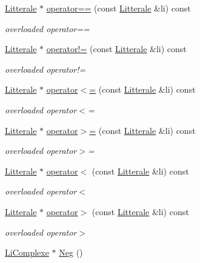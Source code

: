 \begin{DoxyCompactItemize}
\hyperlink{class_litterale}{Litterale} $\ast$ \hyperlink{class_li_complexe_a80fb4bf75402d5d1b8f1a3b9622b9047}{operator==} (const \hyperlink{class_litterale}{Litterale} \&li) const 
\begin{DoxyCompactList}\small\item\em overloaded operator== \end{DoxyCompactList}\item 
\hyperlink{class_litterale}{Litterale} $\ast$ \hyperlink{class_li_complexe_a85020ff32c533327425c70ebbf804abf}{operator!=} (const \hyperlink{class_litterale}{Litterale} \&li) const 
\begin{DoxyCompactList}\small\item\em overloaded operator!= \end{DoxyCompactList}\item 
\hyperlink{class_litterale}{Litterale} $\ast$ \hyperlink{class_li_complexe_ae749d5d340b4bf8e878442a38caa78c1}{operator$<$=} (const \hyperlink{class_litterale}{Litterale} \&li) const 
\begin{DoxyCompactList}\small\item\em overloaded operator$<$= \end{DoxyCompactList}\item 
\hyperlink{class_litterale}{Litterale} $\ast$ \hyperlink{class_li_complexe_a5c67194eb76e8760ce6dfec0e89f477a}{operator$>$=} (const \hyperlink{class_litterale}{Litterale} \&li) const 
\begin{DoxyCompactList}\small\item\em overloaded operator$>$= \end{DoxyCompactList}\item 
\hyperlink{class_litterale}{Litterale} $\ast$ \hyperlink{class_li_complexe_acb3d4e0f6636270f861490c465d07711}{operator$<$} (const \hyperlink{class_litterale}{Litterale} \&li) const 
\begin{DoxyCompactList}\small\item\em overloaded operator$<$ \end{DoxyCompactList}\item 
\hyperlink{class_litterale}{Litterale} $\ast$ \hyperlink{class_li_complexe_a8b7b532a469c8e2abe976070d7433666}{operator$>$} (const \hyperlink{class_litterale}{Litterale} \&li) const 
\begin{DoxyCompactList}\small\item\em overloaded operator$>$ \end{DoxyCompactList}\item 
\hyperlink{class_li_complexe}{Li\+Complexe} $\ast$ \hyperlink{class_li_complexe_a71954f11bfc89933860279cb932f68a9}{Neg} ()

\end{DoxyCompactItemize}
